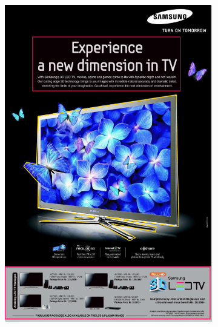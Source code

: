 \begin{figure}[!h]
\begin{subfigure}[b]{0.24\textwidth}
         \includegraphics[scale=0.22]{images/Image2.png}
     \end{subfigure}
     \begin{subfigure}[b]{0.24\textwidth}

\end{subfigure}
\end{figure}
